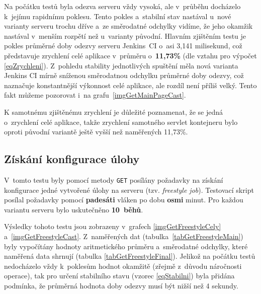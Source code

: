             \medskip
            Na počátku testů byla odezva serveru vždy vysoká, ale v~průběhu docházelo k~jejímu rapidnímu poklesu.
            Tento pokles a~stabilní stav nastával u~nové varianty serveru trochu dříve a~ze
            směrodatné odchylky vidíme, že jeho okamžik nastával v~menším rozpětí než u~varianty původní. Hlavním
            zjištěním testu je pokles průměrné doby odezvy serveru Jenkins~CI o~asi 3,141 milisekund,
            což představuje zrychlení celé aplikace v~průměru o~\textbf{11,73\%} (dle vztahu pro výpočet \ref{eqZrychleni}).
            Z~pohledu stability jednotlivých spuštění měla nová varianta Jenkins CI mírně sníženou
            směrodatnou odchylku průměrné doby odezvy, což naznačuje konstantnější výkonnost celé aplikace,
            ale rozdíl není příliš velký.
            Tento fakt můžeme pozorovat i~na grafu~\ref{imgGetMainPageCast}.
            
            K samotnému zjištěnému zrychlení je důležité poznamenat, že se jedná o~zrychlení celé aplikace, takže
            zrychlení samotného servlet kontejneru bylo oproti původní variantě ještě vyšší než naměřených 11,73\%.
            


        \subsection{Získání konfigurace úlohy}
            V~tomto testu byly pomocí metody \texttt{GET} posílány požadavky na získání
            konfigurace jedné vytvořené úlohy na serveru (tzv. \emph{freestyle job}). 
            Testovací skript posílal požadavky pomocí \textbf{padesáti} vláken po dobu \textbf{osmi} minut.
            Pro každou variantu serveru bylo uskutečněno \textbf{10~běhů}. 

            Výsledky tohoto testu jsou zobrazeny v~grafech \ref{imgGetFreestyleCely} a~\ref{imgGetFreestyleCast}.
            Z~naměřených dat (tabulka~\ref{tabGetFreestyleMain}) byly vypočítány hodnoty aritmetického průměru a~směrodatné odchylky,
            které naměřená data shrnují (tabulka \ref{tabGetFreestyleFinal}).
            Jelikož na
            počátku testů nedocházelo vždy k~poklesům hodnot okamžitě (zřejmě z~důvodu
            náročnosti operace), tak pro určení stabilního stavu (vzorec \ref{eqStabilni}) byla přidána
            podmínka, že průměrná hodnota doby odezvy musí být nižší než 4 sekundy.


